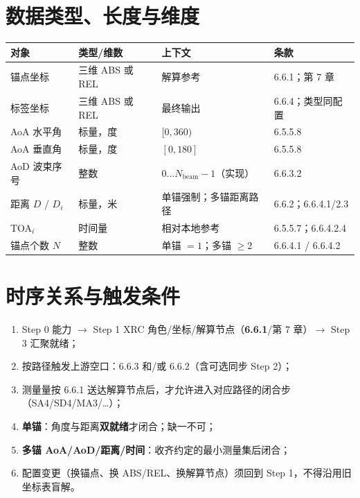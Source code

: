 \documentclass[11pt,a4paper]{ctexart}
\begin{document}
\section{数据类型、长度与维度}

\begin{table}[h]
\centering
\small
\begin{tabular}{llll}
\toprule
\textbf{对象} & \textbf{类型/维数} & \textbf{上下文} & \textbf{条款} \\
\midrule
锚点坐标 & 三维 ABS 或 REL & 解算参考 & 6.6.1；第 7 章 \\
标签坐标 & 三维 ABS 或 REL & 最终输出 & 6.6.4；类型同配置 \\
AoA 水平角 & 标量，度 & $[0,360)$ & 6.5.5.8 \\
AoA 垂直角 & 标量，度 & $[0,180]$ & 6.5.5.8 \\
AoD 波束序号 & 整数 & $0\ldots N_{\mathrm{beam}}-1$（实现） & 6.6.3.2 \\
距离 $D$ / $D_i$ & 标量，米 & 单锚强制；多锚距离路径 & 6.6.2；6.6.4.1/2.3 \\
TOA$_i$ & 时间量 & 相对本地参考 & 6.5.5.7；6.6.4.2.4 \\
锚点个数 $N$ & 整数 & 单锚 $=1$；多锚 $\ge 2$ & 6.6.4.1 / 6.6.4.2 \\
\bottomrule
\end{tabular}
\end{table}

\section{时序关系与触发条件}

\begin{enumerate}[nosep]
  \item Step 0 能力 $\rightarrow$ Step 1 XRC 角色/坐标/解算节点（\textbf{6.6.1}/第 7 章）$\rightarrow$ Step 3 汇聚就绪；
  \item 按路径触发上游空口：6.6.3 和/或 6.6.2（含可选同步 Step 2）；
  \item 测量量按 6.6.1 送达解算节点后，才允许进入对应路径的闭合步（SA4/SD4/MA3/\ldots）；
  \item \textbf{单锚}：角度与距离\textbf{双就绪}才闭合；缺一不可；
  \item \textbf{多锚 AoA/AoD/距离/时间}：收齐约定的最小测量集后闭合；
  \item 配置变更（换锚点、换 ABS/REL、换解算节点）须回到 Step 1，不得沿用旧坐标表盲解。
\end{enumerate}
\end{document}
